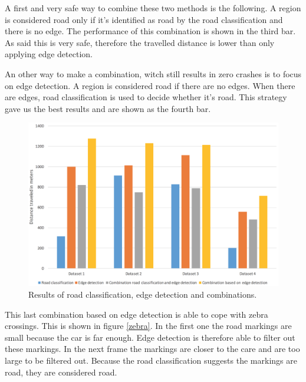 \documentclass[runningheads,a4paper]{llncs}
\begin{document}
A first and very safe way to combine these two methods is the following. A region is considered road only if it's identified as road by the road classification and there is no edge. The performance of this combination is shown in the third bar. As said this is very safe, therefore the travelled distance is lower than only applying edge detection. 

An other way to make a combination, witch still results in zero crashes is to focus on edge detection. A region is considered road if there are no edges. When there are edges, road classification is used to decide whether it's road. This strategy gave us the best results and are shown as the fourth bar.
\begin{figure}[ht]
	\centering
	\includegraphics[width=\textwidth]{fig/distance_result.png}
	\caption{Results of road classification, edge detection and combinations.\label{distance_result}}
\end{figure}

This last combination based on edge detection is able to cope with zebra crossings. This is shown in figure \ref{zebra}. In the first one the road markings are small because the car is far enough. Edge detection is therefore able to filter out these markings. In the next frame the markings are closer to the care and are too large to be filtered out. Because the road classification suggests the markings are road, they are considered road.
\end{document}
